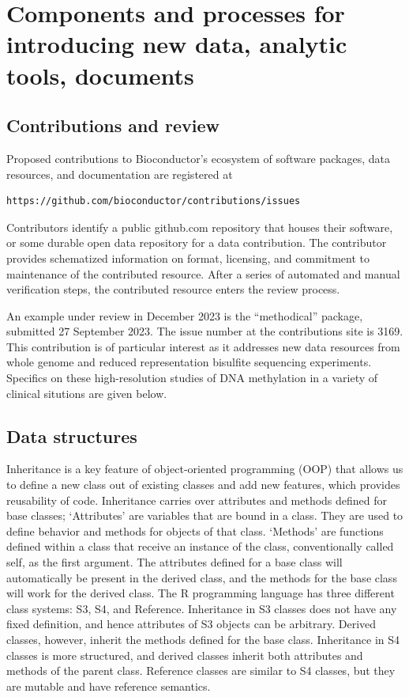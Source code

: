 \documentclass[graybox]{svmult}
\begin{document}
\section{Components and processes for introducing new data, analytic tools, documents}\label{class}

\subsection{Contributions and review}\label{contributions-and-review}

Proposed contributions to Bioconductor's ecosystem of software packages,
data resources, and documentation are registered at
\begin{verbatim}
https://github.com/bioconductor/contributions/issues 
\end{verbatim}
Contributors
identify a public github.com repository that houses
their software, or some durable open data repository
for a data contribution. The contributor
provides schematized information on format, licensing, and commitment
to maintenance of the contributed resource. After a series of
automated and manual verification steps, the contributed
resource enters the review process.

An example under review in December 2023 is the ``methodical''
package, submitted 27 September 2023. The issue number
at the contributions site is 3169. This contribution is of
particular interest as it addresses new data resources from
whole genome and reduced representation bisulfite sequencing
experiments. Specifics on these high-resolution studies
of DNA methylation
in a variety of clinical situtions are given below.

\subsection{Data structures}\label{data-structures}

Inheritance is a key feature of object-oriented programming (OOP) that allows us to define a new class out of existing classes and add new features, which provides reusability of code. Inheritance carries over attributes and methods defined for base classes; `Attributes' are variables that are bound in a class. They are used to define behavior and methods for objects of that class. `Methods' are functions defined within a class that receive an instance of the class, conventionally called self, as the first argument. The attributes defined for a base class will automatically be present in the derived class, and the methods for the base class will work for the derived class. The R programming language has three different class systems: S3, S4, and Reference. Inheritance in S3 classes does not have any fixed definition, and hence attributes of S3 objects can be arbitrary. Derived classes, however, inherit the methods defined for the base class. Inheritance in S4 classes is more structured, and derived classes inherit both attributes and methods of the parent class. Reference classes are similar to S4 classes, but they are mutable and have reference semantics.
\end{document}
